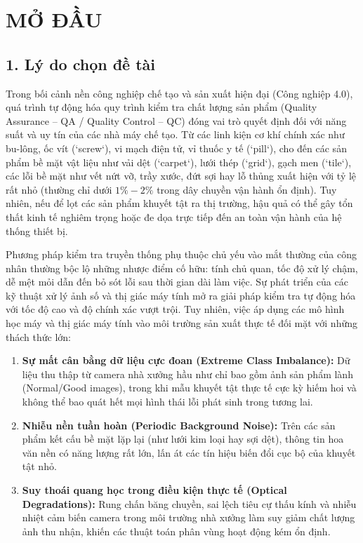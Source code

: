 \chapter*{MỞ ĐẦU}

\section*{1. Lý do chọn đề tài}

Trong bối cảnh nền công nghiệp chế tạo và sản xuất hiện đại (Công nghiệp 4.0), quá trình tự động hóa quy trình kiểm tra chất lượng sản phẩm (Quality Assurance -- QA / Quality Control -- QC) đóng vai trò quyết định đối với năng suất và uy tín của các nhà máy chế tạo. Từ các linh kiện cơ khí chính xác như bu-lông, ốc vít (`screw`), vi mạch điện tử, vỉ thuốc y tế (`pill`), cho đến các sản phẩm bề mặt vật liệu như vải dệt (`carpet`), lưới thép (`grid`), gạch men (`tile`), các lỗi bề mặt như vết nứt vỡ, trầy xước, đứt sợi hay lỗ thủng xuất hiện với tỷ lệ rất nhỏ (thường chỉ dưới $1\% - 2\%$ trong dây chuyền vận hành ổn định). Tuy nhiên, nếu để lọt các sản phẩm khuyết tật ra thị trường, hậu quả có thể gây tổn thất kinh tế nghiêm trọng hoặc đe dọa trực tiếp đến an toàn vận hành của hệ thống thiết bị.

Phương pháp kiểm tra truyền thống phụ thuộc chủ yếu vào mắt thường của công nhân thường bộc lộ những nhược điểm cố hữu: tính chủ quan, tốc độ xử lý chậm, dễ mệt mỏi dẫn đến bỏ sót lỗi sau thời gian dài làm việc. Sự phát triển của các kỹ thuật xử lý ảnh số và thị giác máy tính mở ra giải pháp kiểm tra tự động hóa với tốc độ cao và độ chính xác vượt trội. Tuy nhiên, việc áp dụng các mô hình học máy và thị giác máy tính vào môi trường sản xuất thực tế đối mặt với những thách thức lớn:
\begin{enumerate}
    \item \textbf{Sự mất cân bằng dữ liệu cực đoan (Extreme Class Imbalance):} Dữ liệu thu thập từ camera nhà xưởng hầu như chỉ bao gồm ảnh sản phẩm lành (Normal/Good images), trong khi mẫu khuyết tật thực tế cực kỳ hiếm hoi và không thể bao quát hết mọi hình thái lỗi phát sinh trong tương lai.
    \item \textbf{Nhiễu nền tuần hoàn (Periodic Background Noise):} Trên các sản phẩm kết cấu bề mặt lặp lại (như lưới kim loại hay sợi dệt), thông tin hoa văn nền có năng lượng rất lớn, lấn át các tín hiệu biến đổi cục bộ của khuyết tật nhỏ.
    \item \textbf{Suy thoái quang học trong điều kiện thực tế (Optical Degradations):} Rung chấn băng chuyền, sai lệch tiêu cự thấu kính và nhiễu nhiệt cảm biến camera trong môi trường nhà xưởng làm suy giảm chất lượng ảnh thu nhận, khiến các thuật toán phân vùng hoạt động kém ổn định.
\end{enumerate}

